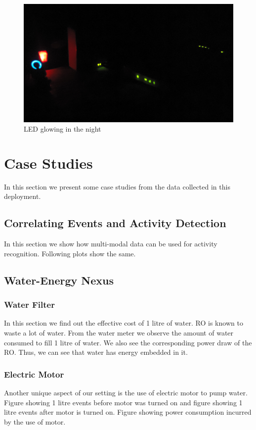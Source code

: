 \documentclass[10pt]{sensys-proc}
\begin{document}
\begin{figure}     
    \includegraphics[scale=0.02]{./figures/led.JPG}    
    \caption{LED glowing in the night}   
    \label{fig:led}
   
\end{figure}

\section{Case Studies}
In this section we present some case studies from the data collected in this deployment.
\subsection{Correlating Events and Activity Detection}
In this section we show how multi-modal data can be used for activity recognition. Following plots show the same.


\subsection{Water-Energy Nexus}
\subsubsection{Water Filter}
In this section we find out the effective cost of 1 litre of water. RO is known to waste a lot of water. From the water meter we observe the amount of water consumed to fill 1 litre of water. We also see the corresponding power draw of the RO. Thus, we can see that water has energy embedded in it.

\subsubsection{Electric Motor}
Another unique aspect of our setting is the use of electric motor to pump water. Figure showing 1 litre events before motor was turned on and figure showing 1 litre events after motor is turned on.
Figure showing power consumption incurred by the use of motor.
\end{document}
